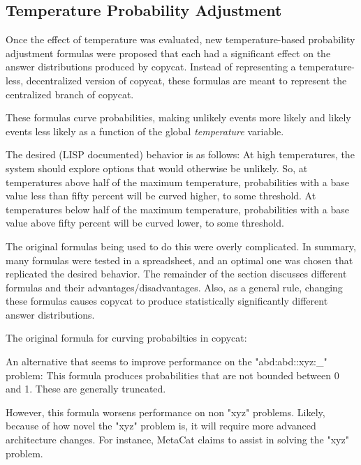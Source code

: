 \documentclass[a4paper]{article}
\begin{document}
    \subsection{Temperature Probability Adjustment}

        Once the effect of temperature was evaluated, new temperature-based probability adjustment formulas were proposed that each had a significant effect on the answer distributions produced by copycat.
        Instead of representing a temperature-less, decentralized version of copycat, these formulas are meant to represent the centralized branch of copycat.

        These formulas curve probabilities, making unlikely events more likely and likely events less likely as a function of the global \emph{temperature} variable.

        The desired (LISP documented) behavior is as follows:
        At high temperatures, the system should explore options that would otherwise be unlikely.
        So, at temperatures above half of the maximum temperature, probabilities with a base value less than fifty percent will be curved higher, to some threshold.
        At temperatures below half of the maximum temperature, probabilities with a base value above fifty percent will be curved lower, to some threshold.

        The original formulas being used to do this were overly complicated.
        In summary, many formulas were tested in a spreadsheet, and an optimal one was chosen that replicated the desired behavior.
        The remainder of the section discusses different formulas and their advantages/disadvantages.
        Also, as a general rule, changing these formulas causes copycat to produce statistically significantly different answer distributions.

        The original formula for curving probabilties in copycat:
        

        An alternative that seems to improve performance on the "abd:abd::xyz:\_" problem:
        This formula produces probabilities that are not bounded between 0 and 1. These are generally truncated.
        

        However, this formula worsens performance on non "xyz" problems.
        Likely, because of how novel the "xyz" problem is, it will require more advanced architecture changes.
        For instance, MetaCat claims to assist in solving the "xyz" problem.
\end{document}
